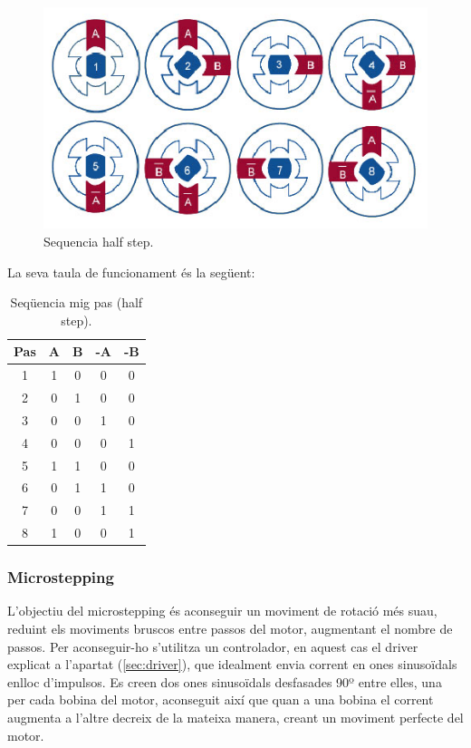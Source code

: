 \begin{figure}[H]
	\centering
	\includegraphics[scale=1.2]{Sequencia_halfstep.eps}
	\caption{Sequencia half step.}
	\label{fig:Sequencia half step}
\end{figure}
La seva taula de funcionament és la següent: 
\begin{table}[htbp]
	\begin{center}
		\begin{tabular}{|c||c|c|c|c|}
			\hline
			Pas & A & B & -A & -B \\
			\hline \hline
			1 & 1 & 0 & 0 & 0 \\ \hline
			2 & 0 & 1 & 0 & 0 \\ \hline
			3 & 0 & 0 & 1 & 0 \\ \hline
			4 & 0 & 0 & 0 & 1 \\ \hline
			5 & 1 & 1 & 0 & 0 \\ \hline
			6 & 0 & 1 & 1 & 0 \\ \hline
			7 & 0 & 0 & 1 & 1 \\ \hline
			8 & 1 & 0 & 0 & 1 \\ \hline
		\end{tabular}
		\caption{Seqüencia mig pas (half step).}
		\label{tabla:hal step}
	\end{center}
\end{table}

\subsubsection{Microstepping}

L'objectiu del microstepping és aconseguir un moviment de rotació més suau, reduint els moviments bruscos entre passos del motor, augmentant el nombre de passos. Per aconseguir-ho s'utilitza un controlador, en aquest cas el driver explicat a l'apartat (\ref{sec:driver}), que idealment envia corrent en ones sinusoïdals enlloc d'impulsos. Es creen dos ones sinusoïdals desfasades 90º entre elles, una per cada bobina del motor, aconseguit així que quan a una bobina el corrent augmenta a l’altre decreix de la mateixa manera, creant un moviment perfecte del motor. 

